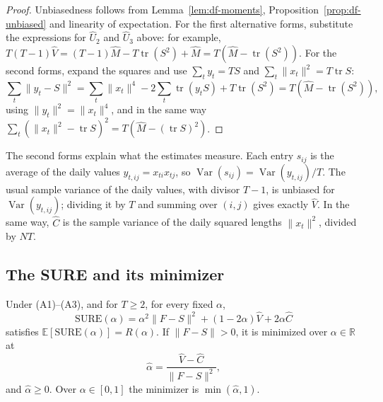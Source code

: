 \begin{proof}
Unbiasedness follows from Lemma~\ref{lem:df-moments}, Proposition~\ref{prop:df-unbiased} and linearity of expectation. For the first alternative forms, substitute the expressions for $\hat U_2$ and $\hat U_3$ above: for example, $T(T-1)\hat V = (T-1)\hat M - T\operatorname{tr}(S^2) + \hat M = T(\hat M - \operatorname{tr}(S^2))$. For the second forms, expand the squares and use $\sum_t y_t = TS$ and $\sum_t \|x_t\|^2 = T\operatorname{tr}S$:
\[
  \sum_t \|y_t - S\|^2 = \sum_t \|x_t\|^4 - 2\sum_t \operatorname{tr}(y_t S) + T\operatorname{tr}(S^2) = T\left(\hat M - \operatorname{tr}(S^2)\right),
\]
using $\|y_t\|^2 = \|x_t\|^4$, and in the same way $\sum_t (\|x_t\|^2 - \operatorname{tr}S)^2 = T(\hat M - (\operatorname{tr}S)^2)$.
\end{proof}

The second forms explain what the estimates measure. Each entry $s_{ij}$ is the average of the daily values $y_{t,ij} = x_{ti}x_{tj}$, so $\operatorname{Var}(s_{ij}) = \operatorname{Var}(y_{t,ij})/T$. The usual sample variance of the daily values, with divisor $T-1$, is unbiased for $\operatorname{Var}(y_{t,ij})$; dividing it by $T$ and summing over $(i,j)$ gives exactly $\hat V$. In the same way, $\hat C$ is the sample variance of the daily squared lengths $\|x_t\|^2$, divided by $NT$.

\subsection{The SURE and its minimizer}

\begin{theorem}\label{thm:df-sure}
Under (A1)--(A3), and for $T \ge 2$, for every fixed $\alpha$,
\[
  \mathrm{SURE}(\alpha) = \alpha^2\|F - S\|^2 + (1 - 2\alpha)\hat V + 2\alpha\hat C
\]
satisfies $\mathbb{E}[\mathrm{SURE}(\alpha)] = R(\alpha)$. If $\|F - S\| > 0$, it is minimized over $\alpha \in \mathbb{R}$ at
\[
  \hat\alpha = \frac{\hat V - \hat C}{\|F - S\|^2},
\]
and $\hat\alpha \ge 0$. Over $\alpha \in [0,1]$ the minimizer is $\min(\hat\alpha, 1)$.
\end{theorem}

